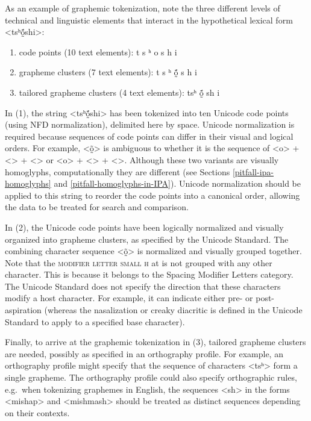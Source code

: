 As an example of graphemic tokenization, note the three different levels of
technical and linguistic elements that interact in the hypothetical lexical
form <tsʰṍ̰shi>:

\begin{enumerate}
	\def\labelenumi{\arabic{enumi}.} 
	\item code points (10 text elements): t s ʰ o    s h i 
	\item grapheme clusters (7 text elements): t s ʰ ṍ̰ s h i 
	\item tailored grapheme clusters (4 text elements): tsʰ ṍ̰ sh i 
\end{enumerate}

In (1), the string <tsʰṍ̰shi> has been tokenized into ten Unicode code points
(using NFD normalization), delimited here by space. Unicode normalization is
required because sequences of code points can differ in their visual and logical
orders. For example, <õ̰> is ambiguous to whether it is the sequence of <o> +
<> + <> or <o> + <> + <>. Although these two variants are visually homoglyphs,
computationally they are different (see Sections \ref{pitfall-ipa-homoglyphs} and \ref{pitfall-homoglyphs-in-IPA}). 
Unicode normalization should be applied to
this string to reorder the code points into a canonical order, allowing the data
to be treated  for search and comparison. 

In (2), the
Unicode code points have been logically normalized and visually organized into
grapheme clusters, as specified by the Unicode Standard. The combining character
sequence <õ̰> is normalized and visually grouped together. Note that the
\textsc{modifier letter small h} at  is not grouped with any 
other character. This is because it
belongs to the Spacing Modifier Letters category. The Unicode Standard 
does not specify the direction that these characters modify a host
character. For example, it can indicate either pre- or post-aspiration (whereas the
nasalization or creaky diacritic is defined in the Unicode Standard to apply to
a specified base character). 

Finally, to arrive at the graphemic tokenization in (3), tailored grapheme
clusters are needed, possibly as specified in an orthography profile. For example,
an orthography profile might specify that the sequence of characters <tsʰ> form
a single grapheme. The orthography profile could also specify orthographic
rules, e.g.~when tokenizing graphemes in English, the sequences <sh> in the
forms <mishap> and <mishmash> should be treated as distinct sequences depending
on their contexts.

